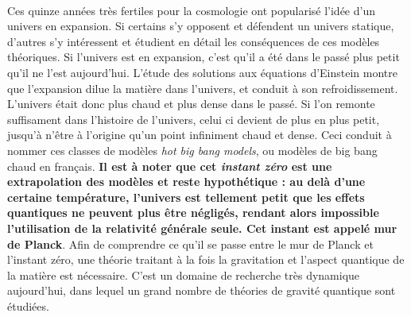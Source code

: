\documentclass[11pt, twoside, a4paper, openright]{report}
\begin{document}
\paragraph{}
Ces quinze années très fertiles pour la cosmologie ont popularisé l'idée d'un univers en expansion. Si certains s'y opposent et défendent un univers statique, d'autres s'y intéressent et étudient en détail les conséquences de ces modèles théoriques. Si l'univers est en expansion, c'est qu'il a été dans le passé plus petit qu'il ne l'est aujourd'hui. L'étude des solutions aux équations d'Einstein montre que l'expansion dilue la matière dans l'univers, et conduit à son refroidissement. L'univers était donc plus chaud et plus dense dans le passé. Si l'on remonte suffisament dans l'histoire de l'univers, celui ci devient de plus en plus petit, jusqu'à n'être à l'origine qu'un point infiniment chaud et dense. Ceci conduit à nommer ces classes de modèles \emph{hot big bang models}, ou modèles de big bang chaud en français.  \textbf{Il est à noter que cet \emph{instant zéro} est une extrapolation des modèles et reste hypothétique : au delà d'une certaine température, l'univers est tellement petit que les effets quantiques ne peuvent plus être négligés, rendant alors impossible l'utilisation de la relativité générale seule. Cet instant est appelé mur de Planck}. Afin de comprendre ce qu'il se passe entre le mur de Planck et l'instant zéro, une théorie traitant à la fois la gravitation et l'aspect quantique de la matière est nécessaire. C'est un domaine de recherche très dynamique aujourd'hui, dans lequel un grand nombre de théories de gravité quantique sont étudiées.
\end{document}
